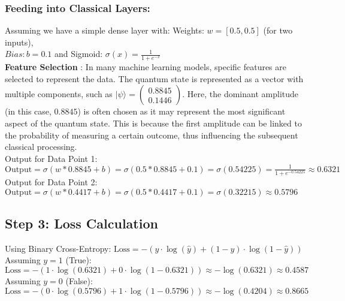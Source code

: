 \documentclass[a4paper]{article}
\begin{document}
\subsubsection*{Feeding into Classical Layers:}

Assuming we have a simple dense layer with: Weights: $ w = [0.5, 0.5]$ (for two inputs), \\ $  Bias:  b = 0.1 $  and  Sigmoid:
$ \sigma(x) = \frac{1}{1 + e^{-x}}$\\

\noindent \textbf{Feature Selection} : In many machine learning models, specific features are selected to represent the data. The quantum state is represented as a vector with multiple components, such as $ | \psi \rangle = \begin{pmatrix} 0.8845 \\ 0.1446 \end{pmatrix}. $  Here, the dominant amplitude (in this case, \( 0.8845 \)) is often chosen as it may represent the most significant aspect of the quantum state. This is because the first amplitude can be linked to the probability of measuring a certain outcome, thus influencing the subsequent classical processing.\\

\noindent Output for Data Point 1: \\ $ \text{Output} = \sigma(w * 0.8845 + b) = \sigma(0.5 * 0.8845 + 0.1)  = \sigma(0.54225) = \frac{1}{1 + e^{-0.54225}} \approx 0.6321 $\\

\noindent Output for Data Point 2: $ \text{Output} = \sigma(w * 0.4417 + b) = \sigma(0.5 * 0.4417 + 0.1)  = \sigma(0.32215) \approx 0.5796 $

\subsection{Step 3: Loss Calculation}

Using Binary Cross-Entropy: $ \text{Loss} = - \left( y \cdot \log(\hat{y}) + (1 - y) \cdot \log(1 - \hat{y}) \right) $ \\

\noindent {} Assuming \(y = 1\) (True): \\ $ \text{Loss} = - \left( 1 \cdot \log(0.6321) + 0 \cdot \log(1 - 0.6321) \right) \approx -\log(0.6321) \approx 0.4587 $ \\
\noindent {} Assuming \(y = 0\) (False): \\$ \text{Loss} = - \left( 0 \cdot \log(0.5796) + 1 \cdot \log(1 - 0.5796) \right) \approx -\log(0.4204) \approx 0.8665 $\\
\end{document}
